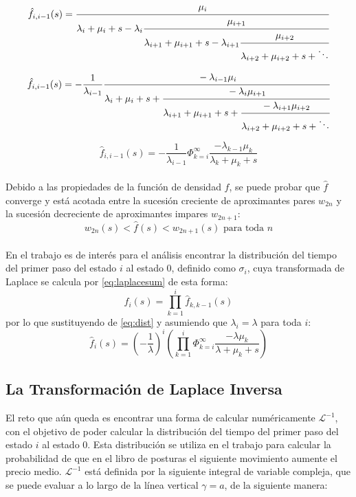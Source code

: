 \documentclass[11pt]{article}
\numberwithin{equation}{section} %
\begin{document}
\[
\hat{f}_{i,i-1}(s) = \cfrac{\mu_{i}}{\lambda_{i}+\mu_{i} + s - \lambda_{i}
\cfrac{\mu_{i+1}}{\lambda_{i+1}+\mu_{i+1} + s - \lambda_{i+1}
\cfrac{\mu_{i+2}}{\lambda_{i+2}+\mu_{i+2} + s + \ddots}}}
\]

\[
\hat{f}_{i,i-1}(s) = -\frac{1}{\lambda_{i-1}} \cfrac{-\lambda_{i-1}\mu_{i}}{\lambda_{i}+\mu_{i} + s +
\cfrac{-\lambda_{i}\mu_{i+1}}{\lambda_{i+1}+\mu_{i+1} + s +
\cfrac{-\lambda_{i+1}\mu_{i+2}}{\lambda_{i+2}+\mu_{i+2} + s + \ddots}}}
\]

\begin{equation} \label{eq:dist}
\hat{f}_{i,i-1}(s) = -\frac{1}{\lambda_{i-1}}\Phi_{k=i}^{\infty}\frac{-\lambda_{k-1}\mu_{k}}{\lambda_{k}+\mu_{k}+s}
\end{equation}\\

Debido a las propiedades de la función de densidad $f$, se puede probar \cite{abate1999} que $\hat{f}$ converge y está acotada entre la sucesión creciente de aproximantes pares $w_{2n}$ y la sucesión decreciente de aproximantes impares $w_{2n+1}$:
\[
w_{2n}(s)<\hat{f}(s)<w_{2n+1}(s) \text{ para toda }n 
\]
\\

En el trabajo es de interés para el análisis encontrar la distribución del tiempo del primer paso del estado $i$ al estado 0, definido como $\sigma_{i}$, cuya transformada de Laplace se calcula por \ref{eq:laplacesum} de esta forma:
\begin{equation}
\hat{f}_{i}(s)=\prod_{k=1}^{i}\hat{f}_{k,k-1}(s)
\end{equation}
por lo que sustituyendo de \ref{eq:dist} y asumiendo que $\lambda_i=\lambda$ para toda $i$:
\begin{equation} \label{eq:fidist}
\hat{f}_{i}(s)=\left(-\frac{1}{\lambda}\right)^i\left(\prod_{k=1}^{i}\Phi_{k=i}^{\infty}\frac{-\lambda\mu_{k}}{\lambda+\mu_{k}+s}\right)
\end{equation}


\subsection{La Transformación de Laplace Inversa}

El reto que aún queda es encontrar una forma de calcular numéricamente $\mathcal{L}^{-1}$, con el objetivo de poder calcular la distribución del tiempo del primer paso del estado $i$ al estado 0. Esta distribución se utiliza en el trabajo para calcular la probabilidad de que en el libro de posturas el siguiente movimiento aumente el precio medio. $\mathcal{L}^{-1}$ está definida por la siguiente integral de variable compleja, que se puede evaluar a lo largo de la línea vertical $\gamma=a$, de la siguiente manera:
\end{document}
